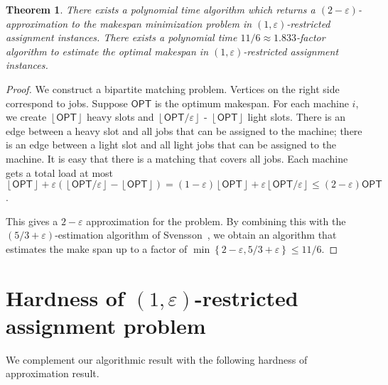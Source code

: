\documentclass[11pt]{article}
\newtheorem{theorem}{Theorem} \newtheorem{lemma}{Lemma}[section]
\newcommand{\set}[1]{\left\{#1\right\}}
\newcommand{\eps}{\varepsilon}
\renewcommand{\epsilon}{\varepsilon}
\newcommand{\OPT}{{\mathsf{OPT}}}
\newcommand{\floor}[1]{\left\lfloor#1\right\rfloor}
\renewcommand{\epsilon}{\varepsilon}
\begin{document}
\begin{theorem}
There exists a polynomial time algorithm which returns a $(2-\epsilon)$-approximation to the makespan minimization problem in $(1,\epsilon)$-restricted assignment instances. There exists a polynomial time $11/6 \approx 1.833$-factor algorithm to estimate the optimal makespan in $(1,\epsilon)$-restricted assignment instances.
\end{theorem}
\begin{proof}
We construct a bipartite matching problem. Vertices on the right side correspond to jobs. Suppose $\OPT$ is the optimum makespan.  For each machine $i$, we create $\floor{\OPT}$ heavy slots and  $\floor{\OPT/\eps}$ - $\floor{\OPT}$ light slots. There is an edge between a heavy slot and all jobs that can be assigned to the machine; there is an edge between a light slot and all light jobs that can be assigned to the machine. It is easy that there is a matching that covers all jobs. Each machine gets a total load at most $\floor{\OPT} + \epsilon(\floor{\OPT/\eps} - \floor{\OPT}) = (1-\eps)\floor{\OPT} + \epsilon\floor{\OPT/\eps} \leq (2-\eps)\OPT$.

This gives a $2-\eps$ approximation for the problem. By combining this with the $(5/3+\eps)$-estimation algorithm of Svensson~\cite{Sve11}, we obtain an algorithm that estimates the make span  up to a factor of $\min \set{2-\eps, 5/3+\eps} \leq 11/6$.

\end{proof}


\section{Hardness of \texorpdfstring{$(1,\epsilon)$}{(1,epsilon)}-restricted assignment problem}
\label{app:hardness}
We complement our algorithmic result with the following hardness of approximation result.
\end{document}
